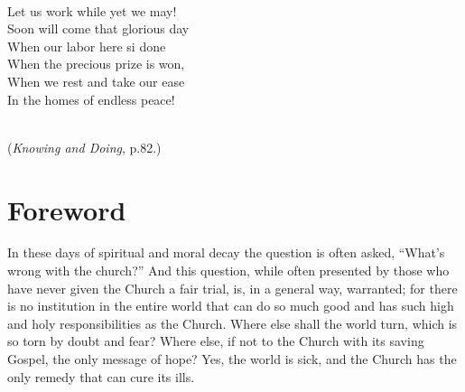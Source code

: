 \documentclass[
]{book}
\begin{document}
\strut \\
\hspace*{0.333em}\hspace*{0.333em}Let us work while yet we may!\\
\hspace*{0.333em}\hspace*{0.333em}Soon will come that glorious day\\
\hspace*{0.333em}\hspace*{0.333em}When our labor here si done\\
\hspace*{0.333em}\hspace*{0.333em}When the precious prize is won,\\
\hspace*{0.333em}\hspace*{0.333em}When we rest and take our ease\\
\hspace*{0.333em}\hspace*{0.333em}In the homes of endless peace!\\
\strut \\
\hspace*{0.333em}\hspace*{0.333em}(\emph{Knowing and Doing}, p.82.)

\hypertarget{foreword}{%
\chapter*{Foreword}\label{foreword}}

In these days of spiritual and moral decay the question is often asked, ``What's wrong with the church?'' And this question, while often presented by those who have never given the Church a fair trial, is, in a general way, warranted; for there is no institution in the entire world that can do so much good and has such high and holy responsibilities as the Church. Where else shall the world turn, which is so torn by doubt and fear? Where else, if not to the Church with its saving Gospel, the only message of hope? Yes, the world is sick, and the Church has the only remedy that can cure its ills.
\end{document}
